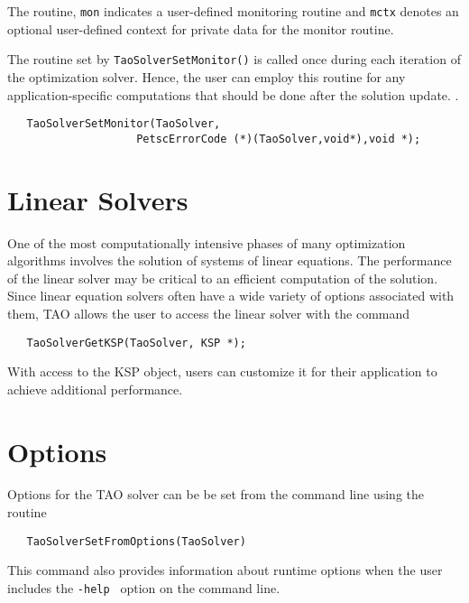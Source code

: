 The routine, {\tt mon} indicates a user-defined monitoring routine
and {\tt mctx} denotes an optional user-defined context for private 
data for the monitor routine.

The routine set by {\tt TaoSolverSetMonitor()} is called once during each
iteration of the optimization solver.  Hence, the
user can employ this routine for any application-specific computations
that should be done after the solution update. 
.
\begin{verbatim}
   TaoSolverSetMonitor(TaoSolver,
                    PetscErrorCode (*)(TaoSolver,void*),void *);
\end{verbatim}



\section{Linear Solvers}\label{sec:TaoLinearSolvers}
One of the most computationally intensive phases of many optimization
algorithms involves the solution of systems of linear equations.  
The performance
of the linear solver may be critical to an efficient computation
of the solution.
Since linear equation solvers often have a wide variety of options 
associated with them, TAO allows the user to access the linear
solver with the command

\begin{verbatim}
   TaoSolverGetKSP(TaoSolver, KSP *);
\end{verbatim}

\noindent
With access to the KSP object, users can customize it for their application
to achieve additional performance.


\section{Options}
Options for the TAO solver 
can be be set from the command line using the routine  
\begin{verbatim}
   TaoSolverSetFromOptions(TaoSolver)
\end{verbatim}
This command also provides information about runtime options when the
user includes the {\tt -help } option on the
command line.

